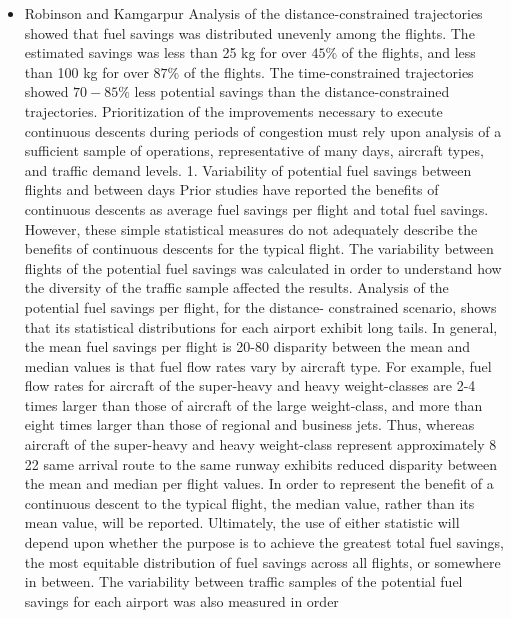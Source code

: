 \documentclass{aer1315-pretty}
\begin{document}
\begin{itemize}
\item Robinson and Kamgarpur \cite{Rob:2010} 
Analysis of the distance-constrained trajectories showed that fuel savings was distributed unevenly among the flights. The estimated savings was less than 25 kg for over $45\%$ of the flights, and less than 100 kg for over $87\%$ of the flights. The time-constrained trajectories showed $70-85\%$ less potential savings than the distance-constrained trajectories. Prioritization of the improvements necessary to execute continuous descents during periods of congestion must rely upon analysis of a sufficient sample of operations, representative of many days, aircraft types, and traffic demand levels.
    1. Variability of potential fuel savings between flights and between days
    Prior studies have reported the benefits of continuous descents as average fuel savings per flight and total fuel
savings. However, these simple statistical measures do not adequately describe the benefits of continuous descents
for the typical flight.
    The variability between flights of the potential fuel savings was calculated in order to understand how the
diversity of the traffic sample affected the results. Analysis of the potential fuel savings per flight, for the distance-
constrained scenario, shows that its statistical distributions for each airport exhibit long tails. In general, the mean
fuel savings per flight is 20-80%
disparity between the mean and median values is that fuel flow rates vary by aircraft type. For example, fuel flow
rates for aircraft of the super-heavy and heavy weight-classes are 2-4 times larger than those of aircraft of the large
weight-class, and more than eight times larger than those of regional and business jets. Thus, whereas aircraft of the
super-heavy and heavy weight-class represent approximately 8%
22%
same arrival route to the same runway exhibits reduced disparity between the mean and median per flight values. In
order to represent the benefit of a continuous descent to the typical flight, the median value, rather than its mean
value, will be reported. Ultimately, the use of either statistic will depend upon whether the purpose is to achieve the
greatest total fuel savings, the most equitable distribution of fuel savings across all flights, or somewhere in
between.
    The variability between traffic samples of the potential fuel savings for each airport was also measured in order

\end{itemize}
\end{document}
